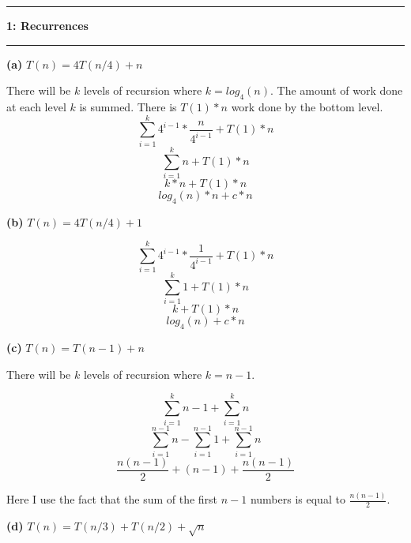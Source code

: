 \documentclass[11pt]{article}
\newcommand\question[2]{\vspace{.25in}\hrule\textbf{#1: #2}\vspace{.5em}\hrule\vspace{.10in}}
\renewcommand\part[1]{\vspace{.10in}\textbf{(#1)}}
\begin{document}
\raggedright
\newcommand\NAME{Jake Pitkin}  %
\newcommand\UID{u0891770}     %
\newcommand\HWNUM{1}              %

\question{1}{Recurrences}

\part{a} $T(n) = 4T(n/4) + n$

There will be $k$ levels of recursion where $k = log_4(n)$. The amount of work done at each level $k$ is summed. There is $T(1) * n$ work done by the bottom level.
$$\sum\limits_{i=1}^k 4^{i-1} * \frac{n}{4^{i-1}} + T(1) * n$$ 
$$\sum\limits_{i=1}^k n + T(1) * n$$
$$k * n + T(1) * n$$
$$log_4(n) * n + c * n$$


\part{b} $T(n) = 4T(n/4) + 1$

$$\sum\limits_{i=1}^k 4^{i-1} * \frac{1}{4^{i-1}} + T(1) * n$$ 
$$\sum\limits_{i=1}^k 1 + T(1) * n$$
$$k  + T(1) * n$$
$$log_4(n) + c * n$$


\part{c} $T(n) = T(n - 1) + n$

There will be $k$ levels of recursion where $ k = n - 1$.

$$\sum\limits_{i=1}^k n-1 + \sum\limits_{i=1}^k n$$
$$\sum\limits_{i=1}^{n-1} n - \sum\limits_{i=1}^{n-1} 1 + \sum\limits_{i=1}^{n-1} n$$
$$\frac{n(n-1)}{2} + (n - 1) + \frac{n(n-1)}{2}$$

Here I use the fact that the sum of the first $n - 1$ numbers is equal to $\frac{n(n-1)}{2}$.


\part{d} $T(n) = T(n/3) + T(n/2) + \sqrt{n}$
\end{document}
